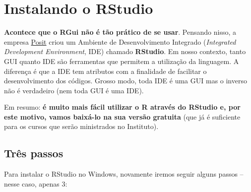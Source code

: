\documentclass[
  letterpaper,
  DIV=11,
  numbers=noendperiod]{scrreprt}
\begin{document}

\chapter{Instalando o RStudio}\label{instalando-o-rstudio}

\textbf{Acontece que o RGui não é tão prático de se usar}. Pensando
nisso, a empresa \href{https://posit.co/}{Posit} criou um Ambiente de
Desenvolvimento Integrado (\emph{Integrated Development Environment},
IDE) chamado \textbf{RStudio}. Em nosso contexto, tanto GUI quanto IDE
são ferramentas que permitem a utilização da linguagem. A diferença é
que a IDE tem atributos com a finalidade de facilitar o desenvolvimento
dos códigos. Grosso modo, toda IDE é uma GUI mas o inverso não é
verdadeiro (nem toda GUI é uma IDE).

Em resumo: \textbf{é muito mais fácil utilizar o R através do RStudio e,
por este motivo, vamos baixá-lo na sua versão gratuita} (que já é
suficiente para os cursos que serão ministrados no Instituto).

\section{Três passos}\label{truxeas-passos}

Para instalar o RStudio no Windows, novamente iremos seguir alguns
passos -- nesse caso, apenas 3:
\end{document}
